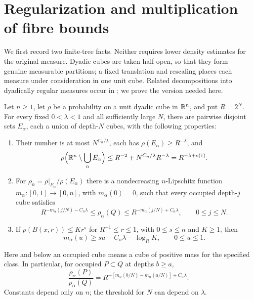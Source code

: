 \section{Regularization and multiplication of fibre bounds}\label{reg:section}

We first record two finite-tree facts.  Neither requires lower density
estimates for the original measure.  Dyadic cubes are taken half open, so
that they form genuine measurable partitions; a fixed translation and
rescaling places each measure under consideration in one unit cube.
Related decompositions into dyadically regular measures occur in
\cite[Corollary~3.5]{KS2019}; we prove the version needed here.

\begin{lemma}\label{reg:regularization}
Let $n\ge1$, let $\rho$ be a probability on a unit dyadic cube in
$\mathbb R^n$, and put $R=2^N$.  For every fixed $0<\lambda<1$ and all
sufficiently large $N$, there are pairwise disjoint sets $E_\alpha$,
each a union of depth-$N$ cubes, with the following properties:
\begin{enumerate}
\item Their number is at most $N^{C_n/\lambda}$, each has
      $\rho(E_\alpha)\ge R^{-\lambda}$, and
      \[
      \rho\Bigl(\mathbb R^n\setminus\bigcup_\alpha E_\alpha\Bigr)
      \le R^{-2}+N^{C_n/\lambda}R^{-\lambda}
      =R^{-\lambda+o(1)}.
      \]
\item For $\rho_\alpha=\rho|_{E_\alpha}/\rho(E_\alpha)$ there is a
      nondecreasing $n$-Lipschitz function $m_\alpha:[0,1]\to[0,n]$,
      with $m_\alpha(0)=0$, such that every occupied depth-$j$ cube
      satisfies
      \begin{equation}\label{reg:cell-mass}
      R^{-m_\alpha(j/N)-C_n\lambda}
      \le\rho_\alpha(Q)\le
      R^{-m_\alpha(j/N)+C_n\lambda},\qquad 0\le j\le N.
      \end{equation}
\item If $\rho(B(x,r))\le Kr^s$ for $R^{-1}\le r\le1$, with
      $0\le s\le n$ and $K\ge1$, then
      \begin{equation}\label{reg:profile-lower-bound}
      m_\alpha(u)\ge su-C_n\lambda-\log_R K,
      \qquad 0\le u\le1.
      \end{equation}
\end{enumerate}
Here and below an occupied cube means a cube of positive mass for the
specified class.  In particular, for occupied $P\subset Q$ at depths
$b\ge a$,
\begin{equation}\label{reg:conditional-mass}
\frac{\rho_\alpha(P)}{\rho_\alpha(Q)}
 =R^{-[m_\alpha(b/N)-m_\alpha(a/N)]\pm C_n\lambda}.
\end{equation}
Constants depend only on $n$; the threshold for $N$ can depend on
$\lambda$.
\end{lemma}

